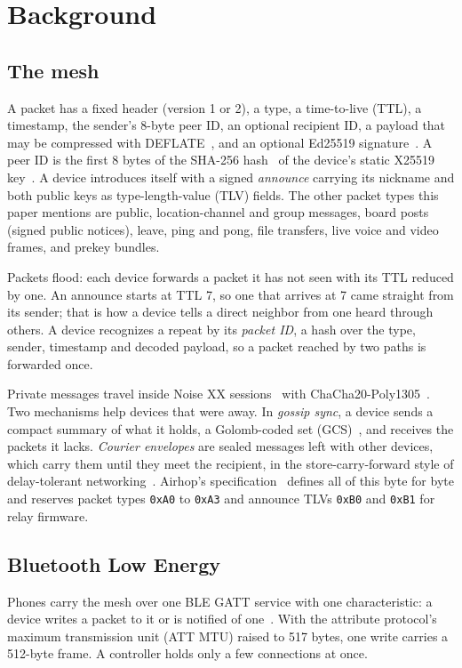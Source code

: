 \documentclass[conference]{IEEEtran}
\newcommand{\hx}[1]{\texttt{0x#1}}
\begin{document}
\section{Background}
\label{sec:background}

\subsection{The mesh}
A packet has a fixed header (version 1 or 2), a type, a time-to-live (TTL), a timestamp, the sender's 8-byte peer ID, an optional recipient ID, a payload that may be compressed with DEFLATE~\cite{rfc1951}, and an optional Ed25519 signature~\cite{rfc8032}. A peer ID is the first 8 bytes of the SHA-256 hash~\cite{fips180_4} of the device's static X25519 key~\cite{rfc7748}. A device introduces itself with a signed \emph{announce} carrying its nickname and both public keys as type-length-value (TLV) fields. The other packet types this paper mentions are public, location-channel and group messages, board posts (signed public notices), leave, ping and pong, file transfers, live voice and video frames, and prekey bundles.

Packets flood: each device forwards a packet it has not seen with its TTL reduced by one. An announce starts at TTL 7, so one that arrives at 7 came straight from its sender; that is how a device tells a direct neighbor from one heard through others. A device recognizes a repeat by its \emph{packet ID}, a hash over the type, sender, timestamp and decoded payload, so a packet reached by two paths is forwarded once.

Private messages travel inside Noise XX sessions~\cite{noise} with ChaCha20-Poly1305~\cite{rfc8439}. Two mechanisms help devices that were away. In \emph{gossip sync}, a device sends a compact summary of what it holds, a Golomb-coded set (GCS)~\cite{putze2007,golomb1966}, and receives the packets it lacks. \emph{Courier envelopes} are sealed messages left with other devices, which carry them until they meet the recipient, in the store-carry-forward style of delay-tolerant networking~\cite{fall2003,rfc4838}. Airhop's specification~\cite{airhopspec} defines all of this byte for byte and reserves packet types \hx{A0} to \hx{A3} and announce TLVs \hx{B0} and \hx{B1} for relay firmware.

\subsection{Bluetooth Low Energy}
Phones carry the mesh over one BLE GATT service with one characteristic: a device writes a packet to it or is notified of one~\cite{btcore}. With the attribute protocol's maximum transmission unit (ATT MTU) raised to 517 bytes, one write carries a 512-byte frame. A controller holds only a few connections at once.
\end{document}

